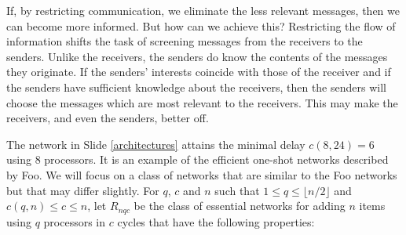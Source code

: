\documentclass[ignorenonframetext]{beamer}
\begin{document}
{}
  If, by restricting communication, we eliminate the less relevant messages,
then we can become more informed. But how can we achieve this? Restricting the
flow of information shifts the task of screening messages from the receivers
to the senders. Unlike the receivers, the senders do know the contents of the
messages they originate. If the senders' interests coincide with those of the
receiver and if the senders have sufficient knowledge about the receivers,
then the senders will choose the messages which are most relevant to the
receivers. This may make the receivers, and even the senders, better off.

  The network in Slide \ref{architectures} attains the minimal delay $c(8,24)
= 6$ using 8 processors. It is an example of the efficient one-shot networks
described by Foo. We will focus on a class of networks that are similar to the
Foo networks but that may differ slightly. For $q$, $c$ and $n$ such that $1
\leq q \leq \lfloor n/2 \rfloor$ and $c(q,n) \leq c \leq n$, let $R_{nqc}$ be
the class of essential networks for adding $n$ items using  $q$ processors in
$c$ cycles that have the following  properties:
\end{document}
